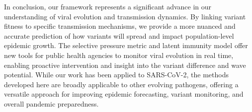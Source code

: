\documentclass[11pt,oneside,letterpaper]{article}
\begin{document}


%


In conclusion, our framework represents a significant advance in our understanding of viral evolution and transmission dynamics.
By linking variant fitness to specific transmission mechanisms, we provide a more nuanced and accurate prediction of how variants will spread and impact population-level epidemic growth.
The selective pressure metric and latent immunity model offer new tools for public health agencies to monitor viral evolution in real time, enabling proactive intervention and insight into the variant difference and wave potential.
While our work has been applied to SARS-CoV-2, the methods developed here are broadly applicable to other evolving pathogens, offering a versatile approach for improving epidemic forecasting, variant monitoring, and overall pandemic preparedness.
\end{document}
